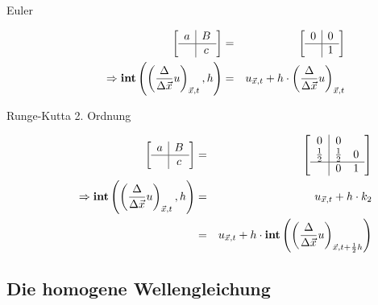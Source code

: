 \documentclass[11pt]{report} %
\theoremstyle{definition}
\begin{document}
\begin{description}
\item[Euler]
\begin{eqnarray*}
\begin{bmatrix}
\begin{array}{c|c}
a & B\\
\hline     & c \\
\end{array}
\end{bmatrix}
 &=& \begin{bmatrix}
\begin{array}{c|c}
0 & 0 \\\hline
& 1
\end{array}
\end{bmatrix} \\
\Rightarrow \mathbf{int}\left(\left(\frac{\Delta}{\Delta \vec x}u \right)_{\vec x, t}, h\right) &=& u_{\vec x, t} + h\cdot \left(\frac{\Delta}{\Delta \vec x}u \right)_{\vec x, t}
\end{eqnarray*}

\item[Runge-Kutta 2. Ordnung]
\begin{eqnarray*}
\begin{bmatrix}
\begin{array}{c|c}
a & B\\
\hline     & c \\
\end{array}
\end{bmatrix} &=& \begin{bmatrix}
\begin{array}{c|cc}
0 & 0 \\
\frac 1 2 & \frac 1 2 & 0 \\\hline
& 0 & 1
\end{array}
\end{bmatrix} \\
\Rightarrow \mathbf{int}\left(\left(\frac{\Delta}{\Delta \vec x}u \right)_{\vec x, t}, h\right) &=& u_{\vec x, t} + h\cdot k_2 \\
&=&  u_{\vec x, t} + h\cdot\mathbf{int}\left(\left(\frac{\Delta}{\Delta \vec x}u \right)_{\vec x, t + \frac 1 2 h} \right) \\
\end{eqnarray*}

\end{description}

\subsection{Die homogene Wellengleichung}
\end{document}
